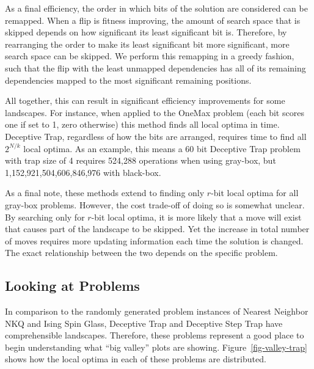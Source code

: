 As a final efficiency, the order in which bits of the solution are considered can be remapped. When a flip is fitness
improving, the amount of search space that is skipped depends on how significant its least significant bit is. Therefore,
by rearranging the order to make its least significant bit more significant, more search space can be skipped. We perform
this remapping in a greedy fashion, such that the flip with the least unmapped dependencies has all of its remaining dependencies
mapped to the most significant remaining positions.

All together, this can result in significant efficiency improvements for some landscapes. For instance, when applied to
the OneMax problem (each bit scores one if set to 1, zero otherwise) this method finds all local optima in  time.
Deceptive Trap, regardless of how the bits are arranged, requires  time to find all $2^{N/k}$ local optima.
As an example, this means a 60 bit
Deceptive Trap problem with trap size of 4 requires 524,288 operations when using gray-box, but 1,152,921,504,606,846,976
with black-box.

As a final note, these methods extend to finding only $r$-bit local optima for all gray-box problems. However,
the cost trade-off of doing so is somewhat unclear. By searching only for $r$-bit local optima, it is more likely
that a move will exist that causes part of the landscape to be skipped. Yet the increase in total number of moves
requires more updating information each time the solution is changed. The exact relationship between the two
depends on the specific problem.

\subsection{Looking at Problems}
In comparison to the randomly generated problem instances of Nearest Neighbor NKQ and Ising Spin Glass,
Deceptive Trap and Deceptive Step Trap have comprehensible landscapes. Therefore, these problems represent
a good place to begin understanding what ``big valley'' plots are showing. Figure~\ref{fig-valley-trap} shows
how the local optima in each of these problems are distributed.

